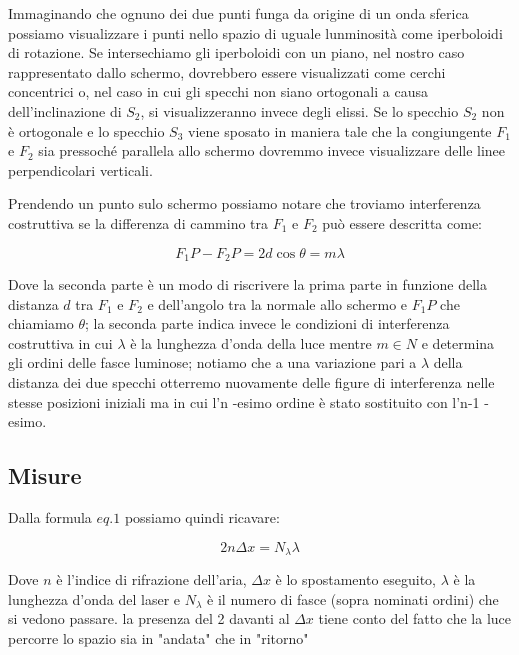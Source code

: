 \documentclass{article}
\begin{document}
Immaginando che ognuno dei due punti funga da origine di un onda sferica possiamo visualizzare i punti nello spazio di uguale lunminosità come iperboloidi di rotazione. Se intersechiamo gli iperboloidi con un piano, nel nostro caso rappresentato dallo schermo, dovrebbero essere visualizzati come cerchi concentrici o, nel caso in cui gli specchi non siano ortogonali a causa dell'inclinazione di $S_2$, si visualizzeranno invece degli elissi. 
Se lo specchio $S_2$ non è ortogonale e lo specchio $S_3$ viene sposato in maniera tale che la congiungente  $F_1$ e $F_2$ sia pressoché parallela allo schermo dovremmo invece visualizzare delle linee perpendicolari verticali. 

Prendendo un punto sulo schermo possiamo notare che troviamo interferenza costruttiva se la differenza di cammino tra $F_1$ e $F_2$ può essere descritta come:

\begin{equation} 
F_1P - F_2 P = 2d \cos{\theta} = m \lambda 
\end{equation}

Dove la seconda parte è un modo di riscrivere la prima parte in funzione della distanza $d$ tra $F_1$ e $F_2$ e dell'angolo tra la normale allo schermo e $F_1 P$ che chiamiamo $\theta$; la seconda parte indica invece le condizioni di interferenza costruttiva in cui $\lambda$ è la lunghezza d'onda della luce mentre $m \in N$ %
e determina gli ordini delle fasce luminose; notiamo che a una variazione pari a $\lambda$ della distanza dei due specchi otterremo nuovamente delle figure di interferenza nelle stesse posizioni iniziali ma in cui l'n -esimo ordine è stato sostituito con l'n-1 -esimo.


\subsection{Misure}
Dalla formula $eq.1$ possiamo quindi ricavare:

\begin{equation} 
2 n \Delta{x} = N_\lambda \lambda 
\end{equation}

Dove $n$ è l'indice di rifrazione dell'aria, $\Delta{x}$ è lo spostamento eseguito, $\lambda$ è la lunghezza d'onda del laser e $N_\lambda$ è il numero di fasce (sopra nominati ordini) che si vedono passare. la presenza del 2 davanti al $\Delta{x}$ tiene conto del fatto che la luce percorre lo spazio sia in "andata" che in "ritorno"
\end{document}
